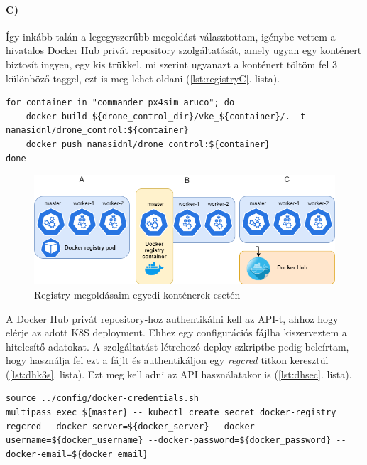 \paragraph{C)}
Így inkább talán a legegyszerűbb megoldást választottam, igénybe vettem a hivatalos Docker Hub privát repository szolgáltatását, amely ugyan egy konténert biztosít ingyen, egy kis trükkel, mi szerint ugyanazt a konténert töltöm fel 3 különböző taggel, ezt is meg lehet oldani (\ref{lst:registryC}. lista).
\begin{minipage}{\linewidth}
\begin{lstlisting}[caption={Docker Hub build és push},label={lst:registryC}]
for container in "commander px4sim aruco"; do
	docker build ${drone_control_dir}/vke_${container}/. -t nanasidnl/drone_control:${container}
	docker push nanasidnl/drone_control:${container}
done
\end{lstlisting}
\end{minipage}

 \begin{figure}
 	\centering
 	\includegraphics[width=\linewidth]{figures/registry.png}
 	\caption{Registry megoldásaim egyedi konténerek esetén}
 	\label{fig:registry}
 \end{figure}

\noindent
A Docker Hub privát repository-hoz authentikálni kell az API-t, ahhoz hogy elérje az adott K8S deployment. Ehhez egy configurációs fájlba kiszerveztem a hitelesítő adatokat. A szolgáltatást létrehozó deploy szkriptbe pedig beleírtam, hogy használja fel ezt a fájlt és authentikáljon egy \emph{regcred} titkon keresztül (\ref{lst:dhk3s}. lista). Ezt meg kell adni az API használatakor is (\ref{lst:dhsec}. lista).
\begin{minipage}{\linewidth}
\begin{lstlisting}[caption={Docker Hub authentikáció K3S-ről},label={lst:dhk3s}]
source ../config/docker-credentials.sh
multipass exec ${master} -- kubectl create secret docker-registry regcred --docker-server=${docker_server} --docker-username=${docker_username} --docker-password=${docker_password} --docker-email=${docker_email}
\end{lstlisting}
\end{minipage}

